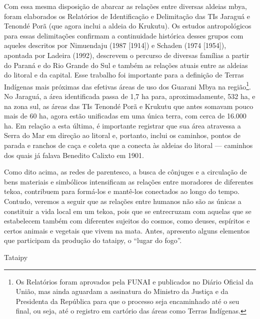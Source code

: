 Com essa mesma disposição de abarcar as relações entre diversas aldeias
mbya, foram elaborados os Relatórios de Identificação e Delimitação das
TIs Jaraguá e Tenondé Porã (que agora inclui a aldeia do Krukutu). Os
estudos antropológicos para essas delimitações confirmam a continuidade
histórica desses grupos com aqueles descritos por Nimuendaju (1987
[1914]) e Schaden (1974 [1954]), apontada por Ladeira (1992), descrevem
o percurso de diversas famílias a partir do Paraná e do Rio Grande do
Sul e também as relações atuais entre as aldeias do litoral e da
capital. Esse trabalho foi importante para a definição de Terras
Indígenas mais próximas das efetivas áreas de uso dos Guarani Mbya na
região\footnote{Os Relatórios foram aprovados pela FUNAI e publicados
no Diário Oficial da União, mas ainda aguardam a assinatura do Ministro
da Justiça e da Presidenta da República para que o processo seja
encaminhado até o seu final, ou seja, até o registro em cartório das
áreas como Terras Indígenas.}. No Jaraguá, a área identificada passa de
1,7 ha para, aproximadamente, 532 ha, e na zona sul, as áreas das TIs
Tenondé Porã e Krukutu que antes somavam pouco mais de 60 ha, agora
estão unificadas em uma única terra, com cerca de 16.000 ha. Em relação
a esta última, é importante registrar que sua área atravessa a Serra do
Mar em direção ao litoral e, portanto, inclui os caminhos, pontos de
parada e ranchos de caça e coleta que a conecta às aldeias do litoral —
caminhos dos quais já falava Benedito Calixto em 1901.

Como dito acima, as redes de parentesco, a busca de cônjuges e a
circulação de bens materiais e simbólicos intensificam as relações
entre moradores de diferentes tekoa, contribuem para formá-los e
mantê-los conectados ao longo do tempo. Contudo, veremos a seguir que
as relações entre humanos não são as únicas a constituir a vida local
em um tekoa, pois que se entrecruzam com aquelas que se estabelecem
também com diferentes sujeitos do cosmos, como deuses, espíritos e
certos animais e vegetais que vivem na mata. Antes, apresento alguns
elementos que participam da produção do tataipy, o ``lugar do fogo''.

Tataipy

